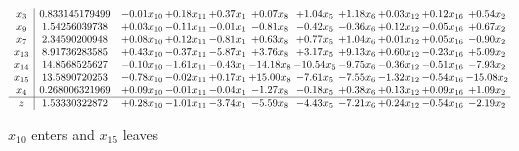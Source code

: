 \documentclass[9pt]{article}
\begin{document}
 \[\begin{array}{c| c c@{\hskip 2pt} c@{\hskip 2pt} c@{\hskip 2pt} c@{\hskip 2pt} c@{\hskip 2pt} c@{\hskip 2pt} c@{\hskip 2pt} c@{\hskip 2pt} c@{\hskip 2pt} }
 x_{3}   &  0.833145179499 & -0.01 x_{10} & +  0.18 x_{11} & +  0.37 x_{1} & +  0.07 x_{8} & +  1.04 x_{5} & +  1.18 x_{6} & +  0.03 x_{12} & +  0.12 x_{16} & +  0.54 x_{2}\\
 x_{9}   &  1.54256039738 & +  0.03 x_{10} & -0.11 x_{11} & -0.01 x_{1} & -0.81 x_{8} & -0.42 x_{5} & -0.36 x_{6} & +  0.12 x_{12} & -0.05 x_{16} & +  0.67 x_{2}\\
 x_{7}   &  2.34590200948 & +  0.08 x_{10} & +  0.12 x_{11} & -0.81 x_{1} & +  0.63 x_{8} & +  0.77 x_{5} & +  1.04 x_{6} & +  0.01 x_{12} & +  0.05 x_{16} & -0.90 x_{2}\\
 x_{13}   &  8.91736283585 & +  0.43 x_{10} & -0.37 x_{11} & -5.87 x_{1} & +  3.76 x_{8} & +  3.17 x_{5} & +  9.13 x_{6} & +  0.60 x_{12} & -0.23 x_{16} & +  5.09 x_{2}\\
 x_{14}   &  14.8568525627 & -0.10 x_{10} & -1.61 x_{11} & -0.43 x_{1} & -14.18 x_{8} & -10.54 x_{5} & -9.75 x_{6} & -0.36 x_{12} & -0.51 x_{16} & -7.93 x_{2}\\
 x_{15}   &  13.5890720253 & -0.78 x_{10} & -0.02 x_{11} & +  0.17 x_{1} & + 15.00 x_{8} & -7.61 x_{5} & -7.55 x_{6} & -1.32 x_{12} & -0.54 x_{16} & -15.08 x_{2}\\
 x_{4}   &  0.268006321969 & +  0.09 x_{10} & -0.01 x_{11} & -0.04 x_{1} & -1.27 x_{8} & -0.18 x_{5} & +  0.38 x_{6} & +  0.13 x_{12} & +  0.09 x_{16} & +  1.09 x_{2}\\
\hline
z    &  1.53330322872 & +  0.28 x_{10} & -1.01 x_{11} & -3.74 x_{1} & -5.59 x_{8} & -4.43 x_{5} & -7.21 x_{6} & +  0.24 x_{12} & -0.54 x_{16} & -2.19 x_{2}\\
\end{array}\]


 $ x_{10} $ enters and $ x_{15} $ leaves 
\end{document}
